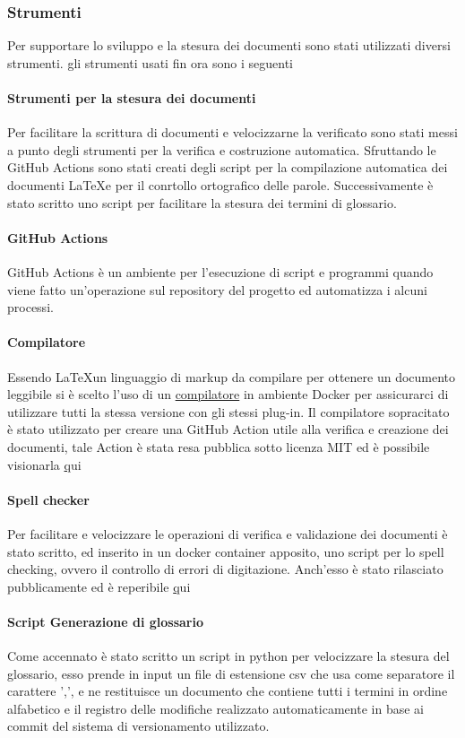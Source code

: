 \subsubsection{Strumenti}
Per supportare lo sviluppo e la stesura dei documenti sono stati utilizzati diversi
strumenti.
gli strumenti usati fin ora sono i seguenti

\paragraph{Strumenti per la stesura dei documenti}
Per facilitare la scrittura di documenti e velocizzarne la verificato sono stati
messi a punto degli strumenti per la verifica e costruzione automatica.
Sfruttando le GitHub Actions sono stati creati degli script per la compilazione
automatica dei documenti \LaTeX \space e per il conrtollo ortografico delle parole.
Successivamente è stato scritto uno script per facilitare la stesura dei termini
di glossario.

\paragraph{GitHub Actions}
GitHub Actions è un ambiente per l'esecuzione di script e programmi quando viene
fatto un'operazione sul repository del progetto ed automatizza i alcuni processi.

\paragraph{Compilatore}
Essendo \LaTeX \space un linguaggio di markup da compilare per ottenere un documento
leggibile si è scelto l'uso di un
\href{https://GitHub.com/dante-ev/docker-texlive}{compilatore} in ambiente Docker\glo
per assicurarci di utilizzare tutti la stessa versione con gli stessi plug-in.
Il compilatore sopracitato è stato utilizzato per creare una GitHub Action utile
alla verifica e creazione dei documenti, tale Action è stata resa pubblica sotto licenza MIT
ed è possibile visionarla \href{https://GitHub.com/Jatus93/Latex-multicompiler}qui

\paragraph{Spell checker}
Per facilitare e velocizzare le operazioni di verifica e validazione dei documenti è
stato scritto, ed inserito in un docker container apposito, uno script per lo
spell checking, ovvero il controllo di errori di digitazione.
Anch'esso è stato rilasciato pubblicamente ed è reperibile \href{https://GitHub.com/Jatus93/spellCheck}qui

\paragraph{Script Generazione di glossario}
Come accennato è stato scritto un script in python per velocizzare la stesura
del glossario, esso prende in input un file di estensione csv che usa come
separatore il carattere ',', e ne restituisce un documento che contiene tutti i
termini in ordine alfabetico e il registro delle modifiche realizzato automaticamente
in base ai commit del sistema di versionamento utilizzato.
